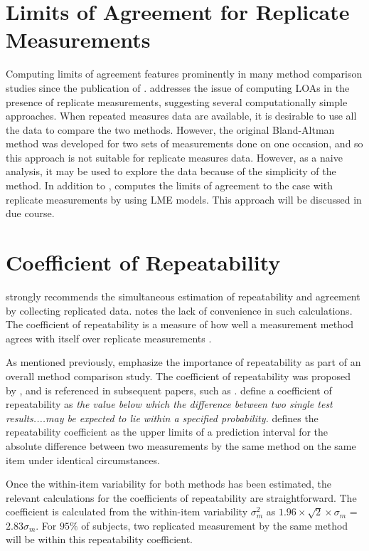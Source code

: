 \documentclass[12pt, a4paper]{report}
\theoremstyle{plain}
\theoremstyle{definition}
\theoremstyle{remark}
\begin{document}
	
	\section{Limits of Agreement for Replicate Measurements}
	
	Computing limits of agreement features prominently in many method comparison studies since the publication of \citet{BA86}.
	\citet{BA99} addresses the issue of computing LOAs in the presence of replicate measurements, suggesting several computationally simple approaches. When repeated measures data are available, it is desirable to use
	all the data to compare the two methods. However, the original Bland-Altman method was developed for two sets of measurements done on one occasion, and so this approach is not suitable for replicate measures data. However, as a naive analysis, it may be used to explore the data because of the simplicity of the method.
	In addition to \citet{BA99}, \citet{BXC2008} computes the limits of agreement to the case with replicate measurements by using LME models. This approach will be discussed in due course.
	
	
	\section{Coefficient of Repeatability}
	
	
	\citet{BA99} strongly recommends the simultaneous estimation of repeatability and agreement by  collecting replicated data. \citet{ARoy2009} notes the lack of convenience in such calculations. The coefficient of repeatability is a measure of how well a measurement method agrees with itself over replicate measurements \citep{BA99}. 
	
	As mentioned previously, \citet{Barnhart} emphasize the importance of repeatability as part of an overall method comparison study. The coefficient of repeatability was proposed by \citet{BA99}, and is referenced in subsequent papers, such as \citet{BXC2008}. \citet{BSIrepeat} define a coefficient of
	repeatability as \emph{the value below which the difference between two single test results....may be expected to lie within a specified probability.} \citet{BA99} defines the repeatability coefficient as the upper limits of a prediction interval for the absolute difference between two measurements by the same method on the same item under identical circumstances. %
	
	Once the within-item variability for both methods has been estimated, the relevant calculations for the coefficients of repeatability are straightforward.
	The coefficient is calculated from the within-item variability $\sigma^2_{m}$ as  $1.96 \times \sqrt{2} \times \sigma_m$ = $2.83 \sigma_m$. For $95\%$ of subjects, two replicated measurement by the same method will be within this repeatability coefficient.
	
\end{document}

